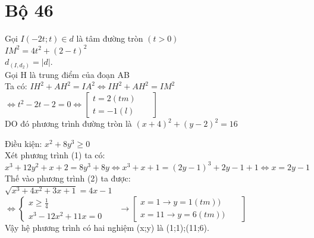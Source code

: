 \section{Bộ 46}
\hda 
Gọi $I\left ( -2t;t \right )\in d$ là tâm đường tròn $\left ( t> 0 \right )$\\
$IM^{2}=4t^{2}+\left ( 2-t \right )^{2}$\\
$d_{\left ( I,d_{2} \right )}=\left | d \right |$.\\
Gọi H là trung điểm của đoạn AB\\
Ta có: $IH^{2}+AH^{2}=IA^{2}\Leftrightarrow IH^{2}+AH^{2}=IM^{2}$\\
$\Leftrightarrow t^{2}-2t-2=0\Leftrightarrow \begin{bmatrix}
t=2\left ( tm \right ) &  & \\ 
t=-1(l) &  & 
\end{bmatrix}$\\
DO đó phương trình đường tròn là $\left ( x+4 \right )^{2}+\left ( y-2 \right )^{2}=16$



\hda 
Điều kiện: $x^{2}+8y^{3}\geq 0$\\
Xét phương trình (1) ta có:\\
$x^{3}+12y^{2}+x+2=8y^{3}+8y\Leftrightarrow x^{3}+x+1=\left ( 2y-1 \right )^{3}+2y-1+1\Leftrightarrow x=2y-1$\\
Thế vào phương trình (2) ta được:\\
$\sqrt{x^{3}+4x^{2}+3x+1}=4x-1$\\
$\Leftrightarrow \left\{\begin{matrix}
x\geq \frac{1}{4} &  & \\ 
x^{3}-12x^{2}+11x=0 &  & 
\end{matrix}\right.\rightarrow \begin{bmatrix}
x=1\rightarrow y=1(tm)) &  & \\ 
x=11\rightarrow y=6(tm)) &  & 
\end{bmatrix}$\\
Vậy hệ phương trình có hai nghiệm (x;y) là (1;1);(11;6).\\

